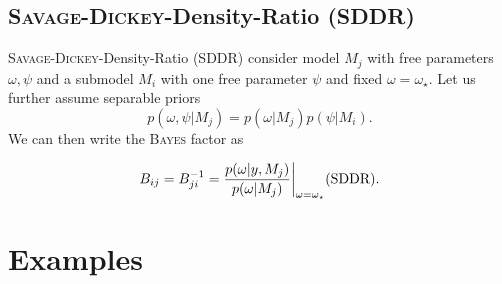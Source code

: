 \documentclass[11pt,aspectratio=1610,dvipsnames]{beamer}
\begin{document}
\subsection{\textsc{Savage-Dickey}-Density-Ratio (SDDR)}
\begin{frame}{\textsc{Savage-Dickey}-Density-Ratio (SDDR)}
	consider model $M_j$ with free parameters $\omega,\psi$ and a submodel $M_i$ with one free parameter $\psi$ and fixed $\omega=\omega_\star$. Let us further assume separable priors $$p(\omega,\psi|M_j)=p(\omega|M_j)p(\psi|M_i).$$
	We can then write the \textsc{Bayes} factor as 
	
\begin{tcolorbox}[colback=black!5,colframe=gray!15!black,title={Savage Dickey-Density-Ratio}]
	\begin{equation}
	\label{eq:sddr}
	B_{ij}=B_{ji}^{-1}=\frac{p(\omega|y,M_j)}{p(\omega|M_j)}\bigg|_{\omega=\omega_\star}  \text{\hfill (SDDR)}.
	\end{equation}
\end{tcolorbox}
\raggedleft
\citet{trotta}
\end{frame}
%

\section{Examples}
\end{document}

